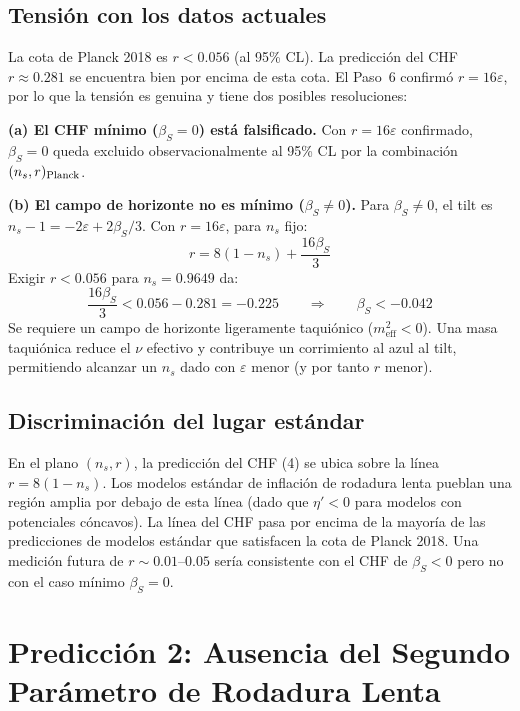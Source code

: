 \documentclass[12pt,a4paper]{article}
\begin{document}
\subsection{Tensión con los datos actuales}

La cota de Planck 2018 es $r < 0.056$ (al 95\% CL). La predicción del CHF $r \approx 0.281$ se encuentra bien por encima de esta cota. El Paso~6 confirmó $r = 16\varepsilon$, por lo que la tensión es genuina y tiene dos posibles resoluciones:

\textbf{(a) El CHF mínimo ($\beta_S = 0$) está falsificado.} Con $r = 16\varepsilon$ confirmado, $\beta_S = 0$ queda excluido observacionalmente al 95\% CL por la combinación $(n_s, r)_{\rm Planck}$.

\textbf{(b) El campo de horizonte no es mínimo ($\beta_S \neq 0$).} Para $\beta_S \neq 0$, el tilt es $n_s - 1 = -2\varepsilon + 2\beta_S/3$. Con $r = 16\varepsilon$, para $n_s$ fijo:
\begin{equation}
r = 8(1 - n_s) + \frac{16\beta_S}{3} \tag{6}
\end{equation}
Exigir $r < 0.056$ para $n_s = 0.9649$ da:
\begin{equation}
\frac{16\beta_S}{3} < 0.056 - 0.281 = -0.225 \qquad \Longrightarrow \qquad \beta_S < -0.042 \tag{7}
\end{equation}
Se requiere un campo de horizonte ligeramente taquiónico ($m_\text{eff}^2 < 0$). Una masa taquiónica reduce el $\nu$ efectivo y contribuye un corrimiento al azul al tilt, permitiendo alcanzar un $n_s$ dado con $\varepsilon$ menor (y por tanto $r$ menor).

\subsection{Discriminación del lugar estándar}

En el plano $(n_s, r)$, la predicción del CHF (4) se ubica sobre la línea $r = 8(1-n_s)$. Los modelos estándar de inflación de rodadura lenta pueblan una región amplia por debajo de esta línea (dado que $\eta' < 0$ para modelos con potenciales cóncavos). La línea del CHF pasa por encima de la mayoría de las predicciones de modelos estándar que satisfacen la cota de Planck 2018. Una medición futura de $r \sim 0.01$--$0.05$ sería consistente con el CHF de $\beta_S < 0$ pero no con el caso mínimo $\beta_S = 0$.

\section{Predicción 2: Ausencia del Segundo Parámetro de Rodadura Lenta}
\end{document}
